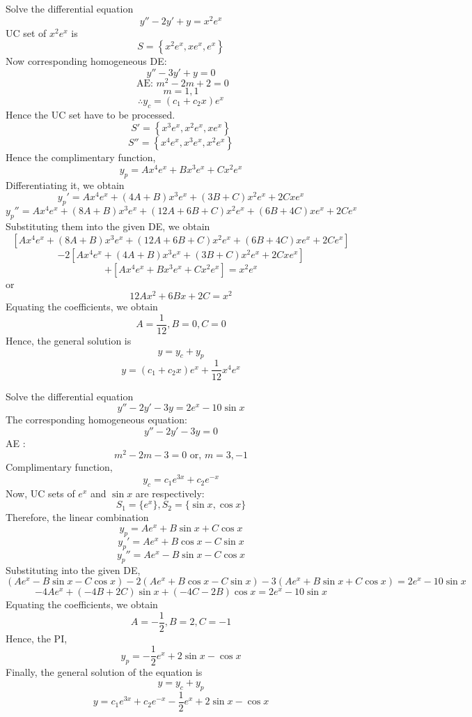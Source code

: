\begin{example}{Solve the differential equation \[
    y'' - 2y' + y = x^2e^{x}
\]}{}\vspace{-20pt}
    UC set of $x^2e^{x}$ is \[
        S = \left\{ x^2e^{x}, xe^{x}, e^{x} \right\}
    \]
    Now corresponding homogeneous DE: \[
        y'' - 3y' + y = 0
    \]
    \[ \text{ AE: } m^2 - 2m + 2 = 0 \]
    \[ m = 1, 1 \]
    \[ \therefore y_c = (c_1 + c_2x)e^{x} \]
    Hence the UC set have to be processed.
    \[ S' = \left\{ x^3e^{x}, x^2e^{x}, xe^{x} \right\} \]
    \[ S'' = \left\{ x^4e^{x}, x^3e^{x}, x^2e^{x} \right\} \]
    Hence the complimentary function, \[
        y_p = Ax^4e^{x} + Bx^3e^{x} + Cx^2e^{x}
    \]
    Differentiating it, we obtain \[
        y_p' = Ax^4e^{x} + (4A+B)x^3e^{x} + (3B+C)x^2e^{x} + 2Cxe^{x}
    \] \[
        y_p'' = Ax^4e^{x} + (8A+B)x^3e^{x} + (12A+6B+C)x^2e^{x} + (6B+4C)xe^{x} + 2Ce^{x}
    \]
    Substituting them into the given DE, we obtain \[
        \left[ Ax^4e^{x} + (8A+B)x^3e^{x} + (12A+6B+C)x^2e^{x} + (6B+4C)xe^{x} + 2Ce^{x} \right] \]\[- 2 \left[ Ax^4e^{x} + (4A+B)x^3e^{x} + (3B+C)x^2e^{x} + 2Cxe^{x} \right] \]\[+ \left[ Ax^4e^{x} + Bx^3e^{x} + Cx^2e^{x} \right] = x^2e^{x}
    \]
    or \[ 12Ax^2 + 6Bx + 2C = x^2 \]
    Equating the coefficients, we obtain \[
        A = \frac{1}{12}, B = 0, C = 0
    \]
    Hence, the general solution is \[
        y = y_c + y_p
    \] \[
        \boxed{ y = (c_1 + c_2x)e^{x} + \frac{1}{12}x^4e^{x} }
    \]
\end{example}

\begin{example}{Solve the differential equation \[
    y'' - 2y' - 3y = 2e^{x} - 10\sin{x}
\]}{}
    The corresponding homogeneous equation: \[
        y'' - 2y' - 3y = 0
    \] AE : \[
        m^2 - 2m - 3 = 0 \text{ or, } m = 3, -1
    \] Complimentary function, \[
        y_c = c_1e^{3x} + c_2e^{-x}
    \]
    Now, UC sets of $e^{x}$ and $\sin{x}$ are respectively: \[
        S_1 = \{ e^{x} \}, S_2 = \{ \sin{x}, \cos{x} \}
    \]
    Therefore, the linear combination \[
        y_p = Ae^{x} + B\sin{x} + C\cos{x}
    \] \[ y_p' = Ae^{x} + B\cos{x} - C\sin{x} \]
    \[ y_p'' = Ae^{x} - B\sin{x} - C\cos{x} \]
    Substituting into the given DE, \[
        ( Ae^{x} - B\sin{x} - C\cos{x} ) - 2( Ae^{x} + B\cos{x} - C\sin{x} ) - 3( Ae^{x} + B\sin{x} + C\cos{x} ) = 2e^{x} - 10\sin{x}
    \] \[
        -4Ae^{x} + ( -4B+2C )\sin{x} + ( -4C-2B )\cos{x} = 2e^{x} - 10\sin{x}
    \]
    Equating the coefficients, we obtain \[
        A = -\frac{1}{2}, B = 2, C = -1
    \]
    Hence, the PI, \[
        y_p = -\frac{1}{2}e^{x} + 2\sin{x} - \cos{x}
    \]
    Finally, the general solution of the equation is \[
        y = y_c + y_p
    \] \[
        \boxed{ y = c_1e^{3x} + c_2e^{-x} - \frac{1}{2}e^{x} + 2\sin{x} - \cos{x} }
    \]
\end{example}

